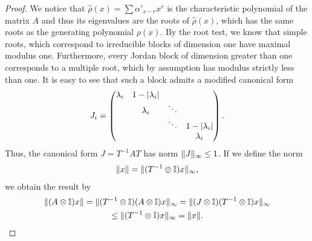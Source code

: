 \begin{proof}
  We notice that $\widehat\rho(x) = \sum \alpha'_{s-r} x^r$ is the
  characteristic polynomial of the matrix $A$ and thus its eigenvalues
  are the roots of $\widehat\rho(x)$, which has the same roots as the
  generating polynomial $\rho(x)$. By the root test, we know that
  simple roots, which correspond to irreducible blocks of dimension
  one have maximal modulus one. Furthermore, every Jordan block of
  dimension greater than one corresponds to a multiple root, which by
  assumption has modulus strictly less than one. It is easy to see
  that such a block admits a modified canonical form
  \begin{gather*}
    J_i =
    \begin{pmatrix}
      \lambda_i & 1- \lvert\lambda_i\rvert\\
        & \lambda_i &\ddots\\
          &&\ddots & 1- \lvert\lambda_i\rvert\\
            &&&\lambda_i
    \end{pmatrix}.
  \end{gather*}
  Thus, the canonical form $J = T^{-1}AT$ has norm $\lVert J\rVert_{\infty}
  \le 1$. If we define the norm
  \begin{gather*}
    \lVert x\rVert = \lVert(T^{-1}\otimes \mathbb I)x\rVert_\infty,
  \end{gather*}
  we obtain the result by
  \begin{multline*}
    \lVert(A\otimes \mathbb I)x\rVert
    = \lVert(T^{-1}\otimes \mathbb I)(A\otimes \mathbb I)x\rVert_\infty
    = \lVert(J\otimes \mathbb I)(T^{-1}\otimes \mathbb I)x\rVert_\infty
    \\
    \le \lVert(T^{-1}\otimes \mathbb I)x\rVert_\infty
    = \lVert x\rVert.
  \end{multline*}
\end{proof}



